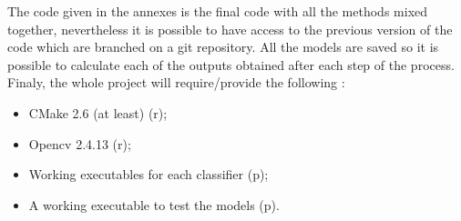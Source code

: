 The code given in the annexes is the final code with all the methods mixed together, nevertheless it is possible to have access to the previous version of the code which are branched on a git repository. All the models are saved so it is possible to calculate each of the outputs obtained after each step of the process. Finaly, the whole project will require/provide the following :
\begin{itemize}
  \item CMake 2.6 (at least) (r);
  \item Opencv 2.4.13 (r);
  \item Working executables for each classifier (p);
  \item A working executable to test the models (p).
\end{itemize}
